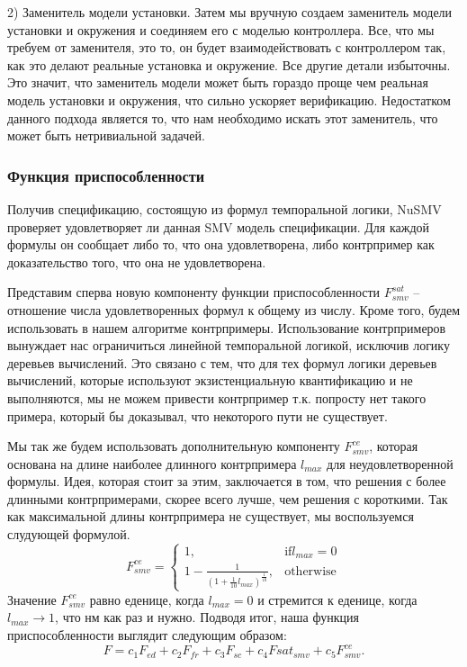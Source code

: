 \documentclass[14pt]{extarticle}
\theoremstyle{plain}
\theoremstyle{definition}
\begin{document}
2) Заменитель модели установки. Затем мы вручную создаем заменитель модели
установки и окружения и соединяем его с моделью контроллера. Все, что мы
требуем от заменителя, это то, он будет взаимодействовать с контроллером так,
как это делают реальные установка и окружение. Все другие детали избыточны. Это
значит, что заменитель модели может быть гораздо проще чем реальная модель
установки и окружения, что сильно ускоряет верификацию. Недостатком данного
подхода является то, что нам необходимо искать этот заменитель, что может быть
нетривиальной задачей.

\subsubsection{Функция приспособленности}

Получив спецификацию, состоящую из формул темпоральной логики, NuSMV проверяет
удовлетворяет ли данная SMV модель спецификации. Для каждой формулы он сообщает
либо то, что она удовлетворена, либо контрпример как доказательство того, что
она не удовлетворена.

Представим сперва новую компоненту функции приспособленности $F^{sat}_{smv}$ --
отношение числа удовлетворенных формул к общему из числу. Кроме того, будем
использовать в нашем алгоритме контрпримеры. Использование контрпримеров
вынуждает нас ограничиться линейной темпоральной логикой, исключив логику
деревьев вычислений. Это связано с тем, что для тех формул логики деревьев
вычислений, которые используют экзистенциальную квантификацию и не выполняются,
мы не можем привести контрпример т.к. попросту нет такого примера, который бы
доказывал, что некоторого пути не существует.

Мы так же будем использовать дополнительную компоненту $F^{ce}_{smv}$, которая
основана на длине наиболее длинного контрпримера $l_{max}$ для
неудовлетворенной формулы. Идея, которая стоит за этим, заключается в том, что
решения с более длинными контрпримерами, скорее всего лучше, чем решения с
короткими. Так как максимальной длины контрпримера не существует, мы
воспользуемся слудующей формулой.
$$
F^{ce}_{smv} = \begin{cases} 1, & \mbox{if} l_{max} = 0 \\
1 - \frac{1}{(1 + \frac{1}{10}l_{max})^{\frac{1}{10}}}, & \mbox{otherwise}
\end{cases}
$$
Значение $F^{ce}_{smv}$ равно еденице, когда $l_{max} = 0$ и стремится к
еденице, когда $l_{max} \rightarrow 1$, что нм как раз и нужно. Подводя итог,
наша функция приспособленности выглядит следующим образом:
$$
F = c_1 F_{ed} + c_2 F_{fr} + c_3 F_{sc} + c_4 F{sat}_{smv} + c_5 F^{ce}_{smv}.
$$
\end{document}
